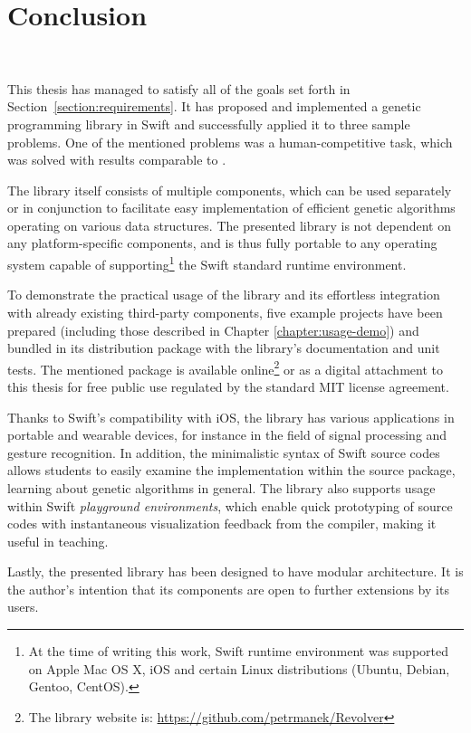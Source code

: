 \chapter{Conclusion}~\label{chapter:conclusion}

This thesis has managed to satisfy all of the goals set forth in Section~\ref{section:requirements}. It has proposed and implemented a genetic programming library in Swift and successfully applied it to three sample problems. One of the mentioned problems was a human-competitive task, which was solved with results comparable to \cite{EvolvingQwopGaits}.

The library itself consists of multiple components, which can be used separately or in conjunction to facilitate easy implementation of efficient genetic algorithms operating on various data structures. The presented library is not dependent on any platform-specific components, and is thus fully portable to any operating system capable of supporting\footnote{At the time of writing this work, Swift runtime environment was supported on Apple Mac OS X, iOS and certain Linux distributions (Ubuntu, Debian, Gentoo, CentOS).} the Swift standard runtime environment. 

To demonstrate the practical usage of the library and its effortless integration with already existing third-party components, five example projects have been prepared (including those described in Chapter \ref{chapter:usage-demo}) and bundled in its distribution package with the library's documentation and unit tests. The mentioned package is available online\footnote{The library website is: \url{https://github.com/petrmanek/Revolver}} or as a digital attachment to this thesis for free public use regulated by the standard MIT license agreement.

Thanks to Swift's compatibility with iOS, the library has various applications in portable and wearable devices, for instance in the field of signal processing and gesture recognition. In addition, the minimalistic syntax of Swift source codes allows students to easily examine the implementation within the source package, learning about genetic algorithms in general. The library also supports usage within Swift \textit{playground environments}, which enable quick prototyping of source codes with instantaneous visualization feedback from the compiler, making it useful in teaching.

Lastly, the presented library has been designed to have modular architecture. It is the author's intention that its components are open to further extensions by its users.

